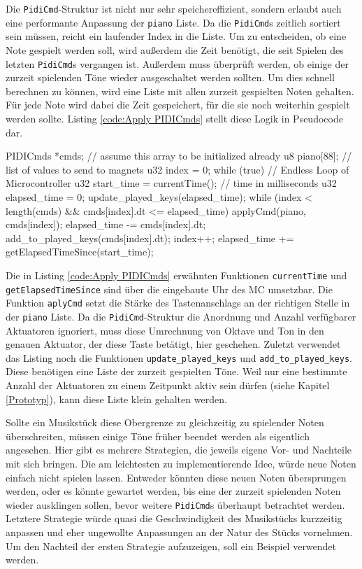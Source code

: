 Die \lstinline{PidiCmd}-Struktur ist nicht nur sehr speichereffizient, sondern erlaubt auch eine performante Anpassung der \lstinline{piano} Liste.
Da die \lstinline{PidiCmd}s zeitlich sortiert sein müssen, reicht ein laufender Index in die Liste.
Um zu entscheiden, ob eine Note gespielt werden soll, wird außerdem die Zeit benötigt, die seit Spielen des letzten \lstinline{PidiCmd}s vergangen ist.
Außerdem muss überprüft werden, ob einige der zurzeit spielenden Töne wieder ausgeschaltet werden sollten.
Um dies schnell berechnen zu können, wird eine Liste mit allen zurzeit gespielten Noten gehalten.
Für jede Note wird dabei die Zeit gespeichert, für die sie noch weiterhin gespielt werden sollte.
Listing \ref{code:Apply PIDICmds} stellt diese Logik in Pseudocode dar.

\begin{UnbrokenCodePage}[style=CStyle, caption={Nutzung der \lstinline{PidiCmd}-Struktur}, label={code:Apply PIDICmds}]
PIDICmds *cmds; // assume this array to be initialized already
u8  piano[88];  // list of values to send to magnets
u32 index = 0;
while (true) {  // Endless Loop of Microcontroller
    u32 start_time   = currentTime(); // time in milliseconds
    u32 elapsed_time = 0;
    update_played_keys(elapsed_time);
    while (index < length(cmds) && cmds[index].dt <= elapsed_time) {
        applyCmd(piano, cmds[index]);
        elapsed_time -= cmds[index].dt;
        add_to_played_keys(cmds[index].dt);
        index++;
    }
    elapsed_time += getElapsedTimeSince(start_time);
}
\end{UnbrokenCodePage}

Die in Listing \ref{code:Apply PIDICmds} erwähnten Funktionen \lstinline{currentTime} und \lstinline{getElapsedTimeSince} sind über die eingebaute Uhr des \ac{MC} umsetzbar.
Die Funktion \lstinline{aplyCmd} setzt die Stärke des Tastenanschlags an der richtigen Stelle in der \lstinline{piano} Liste.
Da die \lstinline{PidiCmd}-Struktur die Anordnung und Anzahl verfügbarer Aktuatoren ignoriert, muss diese Umrechnung von Oktave und Ton in den genauen Aktuator, der diese Taste betätigt, hier geschehen.
Zuletzt verwendet das Listing noch die Funktionen \lstinline{update_played_keys} und \lstinline{add_to_played_keys}.
Diese benötigen eine Liste der zurzeit gespielten Töne.
Weil nur eine bestimmte Anzahl der Aktuatoren zu einem Zeitpunkt aktiv sein dürfen (siehe Kapitel \ref{Prototyp}), kann diese Liste klein gehalten werden.

Sollte ein Musikstück diese Obergrenze zu gleichzeitig zu spielender Noten überschreiten, müssen einige Töne früher beendet werden als eigentlich angesehen.
Hier gibt es mehrere Strategien, die jeweils eigene Vor- und Nachteile mit sich bringen.
Die am leichtesten zu implementierende Idee, würde neue Noten einfach nicht spielen lassen.
Entweder könnten diese neuen Noten übersprungen werden, oder es könnte gewartet werden, bis eine der zurzeit spielenden Noten wieder ausklingen sollen, bevor weitere \lstinline{PidiCmd}s überhaupt betrachtet werden.
Letztere Strategie würde quasi die Geschwindigkeit des Musikstücks kurzzeitig anpassen und eher ungewollte Anpassungen an der Natur des Stücks vornehmen.
Um den Nachteil der ersten Strategie aufzuzeigen, soll ein Beispiel verwendet werden.

